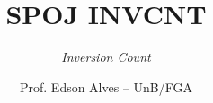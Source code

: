 \title{SPOJ INVCNT}
\subtitle{\textit{Inversion Count}}
\author{Prof. Edson Alves -- UnB/FGA}
\date{}

